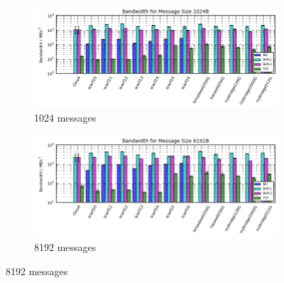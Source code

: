 \documentclass{article}
\begin{document}
             \begin{figure}[H]
                \centering
                \begin{subfigure}{\textwidth}
                  \centering
                    \includegraphics[width=\textwidth]{compare_bandwidth-hostgroup_1024}
                  \caption{1024\si{\byte} messages}
                \end{subfigure}

                \begin{subfigure}{\textwidth}
                  \centering
                     \includegraphics[width=\textwidth]{compare_bandwidth-hostgroup_8192}
                  \caption{8192\si{\byte} messages}
                \end{subfigure}
             \end{figure}
\end{document}
